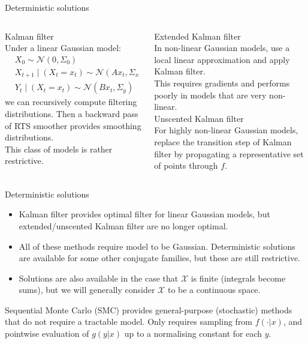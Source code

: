\documentclass[aspectratio=169]{beamer}
\theoremstyle{definition}
\newcommand{\N}{\mathcal{N}}
\begin{document}
\begin{frame}{Deterministic solutions}
\begin{columns}
\begin{column}{0.45\textwidth}
{\Large Kalman filter}\\
Under a linear Gaussian model:
\begin{align*}
& X_0 \sim \N(0, \Sigma_0) \\
& X_{t+1} \mid (X_t = x_t) \sim \N(A x_t, \Sigma_x) \\
& Y_t \mid (X_t = x_t) \sim \N(B x_t, \Sigma_y)
\end{align*}
we can recursively compute filtering distributions. 
Then a backward pass of RTS smoother provides smoothing distributions.\\[7pt]
This class of models is rather restrictive.
\end{column}
\begin{column}{0.45\textwidth}
{\Large Extended Kalman filter}\\
In non-linear Gaussian models, use a local linear approximation and apply Kalman filter.\\[7pt]
This requires gradients and performs poorly in models that are very non-linear.\\[12pt]
{\Large Unscented Kalman filter}\\
For highly non-linear Gaussian models, replace the transition step of Kalman filter by propagating a representative set of points through $f$.
\end{column}
\end{columns}
\end{frame}

\begin{frame}{Deterministic solutions}
\begin{itemize}
\item Kalman filter provides optimal filter for linear Gaussian models, but extended/unscented Kalman filter are no longer optimal.\\[7pt] %
\item All of these methods require model to be Gaussian.
Deterministic solutions are available for some other conjugate families, but these are still restrictive. \\[7pt]
\item Solutions are also available in the case that $\mathcal{X}$ is finite (integrals become sums), but we will generally consider $\mathcal{X}$ to be a continuous space. \\[7pt]
\end{itemize}
Sequential Monte Carlo (SMC) provides general-purpose (stochastic) methods that do not require a tractable model. Only requires sampling from $f(\cdot | x)$, and pointwise evaluation of $g(y | x)$ up to a normalising constant for each $y$.
\end{frame}
\end{document}
